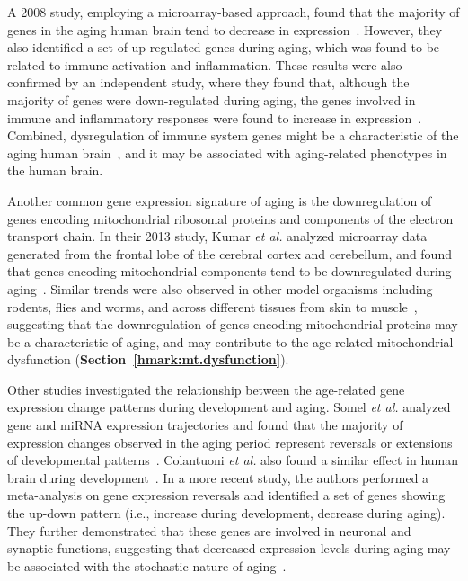 A 2008 study, employing a microarray-based approach, found that the majority of genes in the aging human brain tend to decrease in expression~\cite{Berchtold2008}.
However, they also identified a set of up-regulated genes during aging, which was found to be related to immune activation and inflammation.
These results were also confirmed by an independent study, where they found that, although the majority of genes were down-regulated during aging,
the genes involved in immune and inflammatory responses were found to increase in expression~\cite{Lu2004}.
Combined, dysregulation of immune system genes might be a characteristic of the aging human brain~\cite{Frenk2018}, 
and it may be associated with aging-related phenotypes in the human brain.

Another common gene expression signature of aging is the downregulation of genes encoding mitochondrial ribosomal proteins and components of the electron transport chain.
In their 2013 study, Kumar \textit{et al.} analyzed microarray data generated from the frontal lobe of the cerebral cortex and cerebellum,
and found that genes encoding mitochondrial components tend to be downregulated during aging~\cite{Kumar2013}.
Similar trends were also observed in other model organisms including rodents, flies and worms, and across different tissues from skin to muscle~\cite{Frenk2018},
suggesting that the downregulation of genes encoding mitochondrial proteins may be a characteristic of aging, 
and may contribute to the age-related mitochondrial dysfunction (\textbf{Section~\ref{hmark:mt.dysfunction}}).

Other studies investigated the relationship between the age-related gene expression change patterns during development and aging.
Somel \textit{et al.} analyzed gene and miRNA expression trajectories and found that 
the majority of expression changes observed in the aging period represent reversals or extensions of developmental patterns~\cite{Somel2010}.
Colantuoni \textit{et al.} also found a similar effect in human brain during development~\cite{Colantuoni2011}.
In a more recent study, the authors performed a meta-analysis on gene expression reversals 
and identified a set of genes showing the up-down pattern (i.e., increase during development, decrease during aging).
They further demonstrated that these genes are involved in neuronal and synaptic functions, suggesting that
decreased expression levels during aging may be associated with the stochastic nature of aging~\cite{Donertas2017}.

